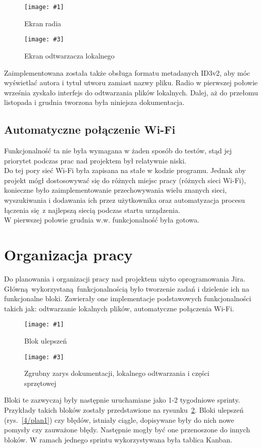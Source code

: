\documentclass[12pt]{report}
\newcommand{\imgintss}[5]{
	\begin{figure}[{#5}]
		\centering
		\begin{minipage}{.45\textwidth}
			\centering
			\texttt{[image: \#1]}
			\caption{#2}
			\label{#1}
		\end{minipage}%
		\hfill
		\begin{minipage}{.45\textwidth}
			\centering
			\texttt{[image: \#3]}
			\caption{#4}
			\label{#3}
		\end{minipage}
	\end{figure}
}
\newcommand{\imghss}[4]{\imgintss{#1}{#2}{#3}{#4}{H}}
\begin{document}
			\imghss{4/scr_radio}{Ekran radia}{4/scr_player}{Ekran odtwarzacza lokalnego}
			
			Zaimplementowana została także obsługa formatu metadanych ID3v2, aby móc wyświetlać autora i tytuł utworu zamiast nazwy pliku. Radio w pierwszej połowie września zyskało interfejs do odtwarzania plików lokalnych. Dalej, aż do przełomu listopada i grudnia tworzona była niniejsza dokumentacja.
			
		\subsection{Automatyczne połączenie Wi-Fi}
			Funkcjonalność ta nie była wymagana w żaden sposób do testów, stąd jej priorytet podczas prac nad projektem był relatywnie niski. 
			$ $\\

			 Do tej pory sieć Wi-Fi była zapisana na stałe w kodzie programu.  Jednak aby projekt mógł dostosowywać się do różnych miejsc pracy (różnych sieci Wi-Fi), konieczne było zaimplementowanie przechowywania wielu znanych sieci, wyszukiwania i dodawania ich przez użytkownika oraz automatyzacja procesu łączenia się z najlepszą siecią podczas startu urządzenia.
			 $ $\\
			 
			 W pierwszej połowie grudnia w.w. funkcjonalność była gotowa.
			 
	 \section{Organizacja pracy}
		Do planowania i organizacji pracy nad projektem użyto oprogramowania Jira. Główną wykorzystaną funkcjonalnością było tworzenie zadań i dzielenie ich na funkcjonalne bloki. Zawierały one implementacje podstawowych funkcjonalności takich jak: odtwarzanie lokalnych plików, automatyczne połączenia Wi-Fi.
		
		\imghss{4/plan1}{Blok ulepszeń}{4/plan2}{Zgrubny zarys dokumentacji, lokalnego odtwarzania i części sprzętowej}
		
		Bloki te zazwyczaj były następnie uruchamiane jako 1-2 tygodniowe sprinty. Przykłady takich bloków zostały przedstawione na rysunku~\ref{4/plan2}. Bloki ulepszeń (rys.~\ref{4/plan1}) czy błędów, istniały ciągle, dopisywane były do nich nowe pomysły czy zauważone błędy. Następnie mogły być one przenoszone do innych bloków.
		W ramach jednego sprintu wykorzystywana była tablica Kanban.
		 $ $\\
		 
\end{document}
